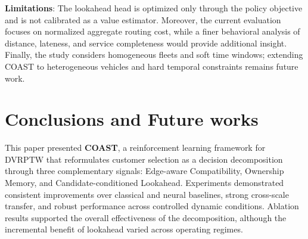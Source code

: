 \documentclass[letterpaper]{article}
\begin{document}
\textbf{Limitations}: The lookahead head is optimized only through the policy objective and is not calibrated as a value estimator. Moreover, the current evaluation focuses on normalized aggregate routing cost, while a finer behavioral analysis of distance, lateness, and service completeness would provide additional insight. Finally, the study considers homogeneous fleets and soft time windows; extending COAST to heterogeneous vehicles and hard temporal constraints remains future work.

\section{Conclusions and Future works} \label{sec:futurework}


This paper presented \textbf{COAST}, a reinforcement learning framework for DVRPTW that reformulates customer selection as a decision decomposition through three complementary signals: Edge-aware Compatibility, Ownership Memory, and Candidate-conditioned Lookahead. Experiments demonstrated consistent improvements over classical and neural baselines, strong cross-scale transfer, and robust performance across controlled dynamic conditions. Ablation results supported the overall effectiveness of the decomposition, although the incremental benefit of lookahead varied across operating regimes.
\end{document}
